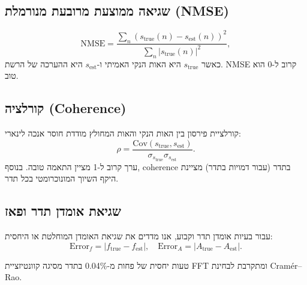 \subsection{שגיאה ממוצעת מרובעת מנורמלת (NMSE)}

\begin{equation}
\text{NMSE} = \frac{\sum_n (s_{\text{true}}(n) - s_{\text{est}}(n))^2}{\sum_n |s_{\text{true}}(n)|^2},
\end{equation}
כאשר $s_{\text{true}}$ היא האות הנקי האמיתי ו-$s_{\text{est}}$ היא ההערכה של הרשת. NMSE קרוב ל-0 הוא טוב.

\subsection{קורלציה (Coherence)}

קורלציית פירסון בין האות הנקי והאות המחולץ מודדת חוסר אנכה לינארי:
\begin{equation}
\rho = \frac{\text{Cov}(s_{\text{true}}, s_{\text{est}})}{\sigma_{s_{\text{true}}} \sigma_{s_{\text{est}}}}.
\end{equation}
ערך קרוב ל-1 מציין התאמה טובה. בנוסף, coherence בתדר (עבור דמויות בתדר) מציינת היקף השיוך המונוכרומטי בכל תדר.

\subsection{שגיאת אומדן תדר ופאז}

עבור בעיות אומדן תדר וקבוע, אנו מדדים את שגיאת האומדן המוחלטת או היחסית:
\begin{equation}
\text{Error}_f = |f_{\text{true}} - f_{\text{est}}|, \quad \text{Error}_A = |A_{\text{true}} - A_{\text{est}}|.
\end{equation}

טעות יחסית של פחות מ-0.04\% בתדר מסיגה קוונטיזציית FFT ומתקרבת לבחינת Cramér--Rao.